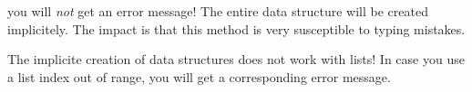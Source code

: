 
you will \textit{not} get an error message! The entire data structure will be created implicitely. The impact is that this method
is very susceptible to typing mistakes.

The implicite creation of data structures does not work with lists! In case you use a list index out of range, you will get
a corresponding error message.


